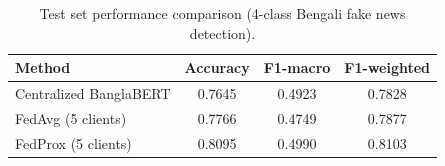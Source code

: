 
\begin{table}[h]
\centering
\caption{Test set performance comparison (4-class Bengali fake news detection).}
\label{tab:results}
\begin{tabular}{lccc}
\hline
\textbf{Method} & \textbf{Accuracy} & \textbf{F1-macro} & \textbf{F1-weighted} \\
\hline
Centralized BanglaBERT & 0.7645 & 0.4923 & 0.7828 \\
FedAvg (5 clients) & 0.7766 & 0.4749 & 0.7877 \\
FedProx (5 clients) & 0.8095 & 0.4990 & 0.8103 \\
\hline
\end{tabular}
\end{table}
